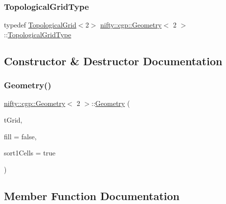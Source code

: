 \subsubsection{\texorpdfstring{Topological\+Grid\+Type}{TopologicalGridType}}
{\footnotesize\ttfamily typedef \hyperlink{classnifty_1_1cgp_1_1TopologicalGrid}{Topological\+Grid}$<$2$>$ \hyperlink{classnifty_1_1cgp_1_1Geometry}{nifty\+::cgp\+::\+Geometry}$<$ 2 $>$\+::\hyperlink{classnifty_1_1cgp_1_1Geometry_3_012_01_4_a6f4a07a376a645097547311fe0ad2836}{Topological\+Grid\+Type}}



\subsection{Constructor \& Destructor Documentation}
\mbox{\label{classnifty_1_1cgp_1_1Geometry_3_012_01_4_a3fa2454e7e2c5a134441928d5907c9dd}} 
\subsubsection{\texorpdfstring{Geometry()}{Geometry()}}
{\footnotesize\ttfamily \hyperlink{classnifty_1_1cgp_1_1Geometry}{nifty\+::cgp\+::\+Geometry}$<$ 2 $>$\+::\hyperlink{classnifty_1_1cgp_1_1Geometry}{Geometry} (\begin{DoxyParamCaption}\item[{const \hyperlink{classnifty_1_1cgp_1_1Geometry_3_012_01_4_a6f4a07a376a645097547311fe0ad2836}{Topological\+Grid\+Type} \&}]{t\+Grid,  }\item[{const bool}]{fill = {\ttfamily false},  }\item[{const bool}]{sort1\+Cells = {\ttfamily true} }\end{DoxyParamCaption})\hspace{0.3cm}{\ttfamily [inline]}}



\subsection{Member Function Documentation}
\mbox{\label{classnifty_1_1cgp_1_1Geometry_3_012_01_4_a74c6ca2e29fb745a6ee5d565553f0e44}} 
